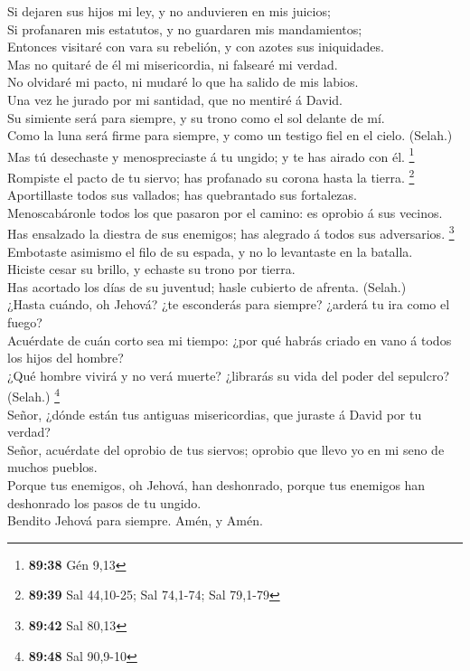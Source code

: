  Si dejaren sus hijos mi ley, y no anduvieren en mis
juicios;\\
 Si profanaren mis estatutos, y no guardaren mis
mandamientos;\\
 Entonces visitaré con vara su rebelión, y con azotes sus
iniquidades.\\
 Mas no quitaré de él mi misericordia, ni falsearé mi
verdad.\\
 No olvidaré mi pacto, ni mudaré lo que ha salido de mis
labios.\\
 Una vez he jurado por mi santidad, que no mentiré á
David.\\
 Su simiente será para siempre, y su trono como el sol
delante de mí.\\
 Como la luna será firme para siempre, y como un testigo
fiel en el cielo. (Selah.)\\
 Mas tú desechaste y menospreciaste á tu ungido; y te has
airado con él. \footnote{\textbf{89:38} Gén 9,13}\\
 Rompiste el pacto de tu siervo; has profanado su corona
hasta la tierra. \footnote{\textbf{89:39} Sal 44,10-25; Sal 74,1-74; Sal
  79,1-79}\\
 Aportillaste todos sus vallados; has quebrantado sus
fortalezas.\\
 Menoscabáronle todos los que pasaron por el camino: es
oprobio á sus vecinos.\\
 Has ensalzado la diestra de sus enemigos; has alegrado á
todos sus adversarios. \footnote{\textbf{89:42} Sal 80,13}\\
 Embotaste asimismo el filo de su espada, y no lo
levantaste en la batalla.\\
 Hiciste cesar su brillo, y echaste su trono por
tierra.\\
 Has acortado los días de su juventud; hasle cubierto de
afrenta. (Selah.)\\
 ¿Hasta cuándo, oh Jehová? ¿te esconderás para siempre?
¿arderá tu ira como el fuego?\\
 Acuérdate de cuán corto sea mi tiempo: ¿por qué habrás
criado en vano á todos los hijos del hombre?\\
 ¿Qué hombre vivirá y no verá muerte? ¿librarás su vida
del poder del sepulcro? (Selah.) \footnote{\textbf{89:48} Sal 90,9-10}\\
 Señor, ¿dónde están tus antiguas misericordias, que
juraste á David por tu verdad?\\
 Señor, acuérdate del oprobio de tus siervos; oprobio que
llevo yo en mi seno de muchos pueblos.\\
 Porque tus enemigos, oh Jehová, han deshonrado, porque
tus enemigos han deshonrado los pasos de tu ungido.\\
 Bendito Jehová para siempre. Amén, y Amén.

